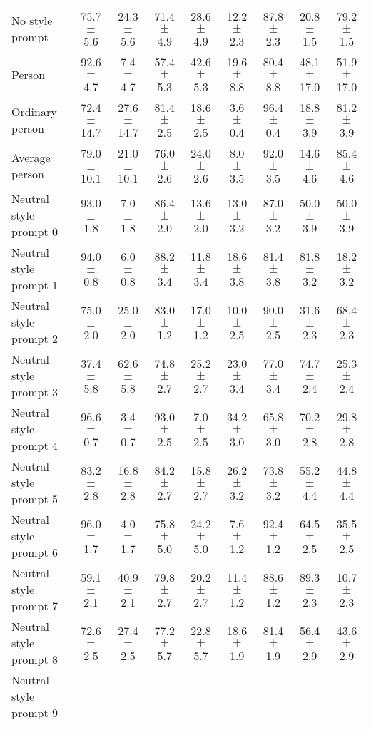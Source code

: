 \begin{table*}[p]
{\begin{tabular}{l|cc|cc|cc|cc}
No style prompt
& 75.7 $\pm$ 5.6 & 24.3 $\pm$ 5.6
& 71.4 $\pm$ 4.9 & 28.6 $\pm$ 4.9
& 12.2 $\pm$ 2.3 & 87.8 $\pm$ 2.3
& 20.8 $\pm$ 1.5 & 79.2 $\pm$ 1.5
\\
Person
& 92.6 $\pm$ 4.7 & 7.4 $\pm$ 4.7
& 57.4 $\pm$ 5.3 & 42.6 $\pm$ 5.3
& 19.6 $\pm$ 8.8 & 80.4 $\pm$ 8.8
& 48.1 $\pm$ 17.0 & 51.9 $\pm$ 17.0
\\
Ordinary person
& 72.4 $\pm$ 14.7 & 27.6 $\pm$ 14.7
& 81.4 $\pm$ 2.5 & 18.6 $\pm$ 2.5
& 3.6 $\pm$ 0.4 & 96.4 $\pm$ 0.4
& 18.8 $\pm$ 3.9 & 81.2 $\pm$ 3.9
\\
Average person
& 79.0 $\pm$ 10.1 & 21.0 $\pm$ 10.1
& 76.0 $\pm$ 2.6 & 24.0 $\pm$ 2.6
& 8.0 $\pm$ 3.5 & 92.0 $\pm$ 3.5
& 14.6 $\pm$ 4.6 & 85.4 $\pm$ 4.6
\\
Neutral style prompt 0
& 93.0 $\pm$ 1.8 & 7.0 $\pm$ 1.8
& 86.4 $\pm$ 2.0 & 13.6 $\pm$ 2.0
& 13.0 $\pm$ 3.2 & 87.0 $\pm$ 3.2
& 50.0 $\pm$ 3.9 & 50.0 $\pm$ 3.9
\\
Neutral style prompt 1
& 94.0 $\pm$ 0.8 & 6.0 $\pm$ 0.8
& 88.2 $\pm$ 3.4 & 11.8 $\pm$ 3.4
& 18.6 $\pm$ 3.8 & 81.4 $\pm$ 3.8
& 81.8 $\pm$ 3.2 & 18.2 $\pm$ 3.2
\\
Neutral style prompt 2
& 75.0 $\pm$ 2.0 & 25.0 $\pm$ 2.0
& 83.0 $\pm$ 1.2 & 17.0 $\pm$ 1.2
& 10.0 $\pm$ 2.5 & 90.0 $\pm$ 2.5
& 31.6 $\pm$ 2.3 & 68.4 $\pm$ 2.3
\\
Neutral style prompt 3
& 37.4 $\pm$ 5.8 & 62.6 $\pm$ 5.8
& 74.8 $\pm$ 2.7 & 25.2 $\pm$ 2.7
& 23.0 $\pm$ 3.4 & 77.0 $\pm$ 3.4
& 74.7 $\pm$ 2.4 & 25.3 $\pm$ 2.4
\\
Neutral style prompt 4
& 96.6 $\pm$ 0.7 & 3.4 $\pm$ 0.7
& 93.0 $\pm$ 2.5 & 7.0 $\pm$ 2.5
& 34.2 $\pm$ 3.0 & 65.8 $\pm$ 3.0
& 70.2 $\pm$ 2.8 & 29.8 $\pm$ 2.8
\\
Neutral style prompt 5
& 83.2 $\pm$ 2.8 & 16.8 $\pm$ 2.8
& 84.2 $\pm$ 2.7 & 15.8 $\pm$ 2.7
& 26.2 $\pm$ 3.2 & 73.8 $\pm$ 3.2
& 55.2 $\pm$ 4.4 & 44.8 $\pm$ 4.4
\\
Neutral style prompt 6
& 96.0 $\pm$ 1.7 & 4.0 $\pm$ 1.7
& 75.8 $\pm$ 5.0 & 24.2 $\pm$ 5.0
& 7.6 $\pm$ 1.2 & 92.4 $\pm$ 1.2
& 64.5 $\pm$ 2.5 & 35.5 $\pm$ 2.5
\\
Neutral style prompt 7
& 59.1 $\pm$ 2.1 & 40.9 $\pm$ 2.1
& 79.8 $\pm$ 2.7 & 20.2 $\pm$ 2.7
& 11.4 $\pm$ 1.2 & 88.6 $\pm$ 1.2
& 89.3 $\pm$ 2.3 & 10.7 $\pm$ 2.3
\\
Neutral style prompt 8
& 72.6 $\pm$ 2.5 & 27.4 $\pm$ 2.5
& 77.2 $\pm$ 5.7 & 22.8 $\pm$ 5.7
& 18.6 $\pm$ 1.9 & 81.4 $\pm$ 1.9
& 56.4 $\pm$ 2.9 & 43.6 $\pm$ 2.9
\\
Neutral style prompt 9

\end{tabular}}
\end{table*}
